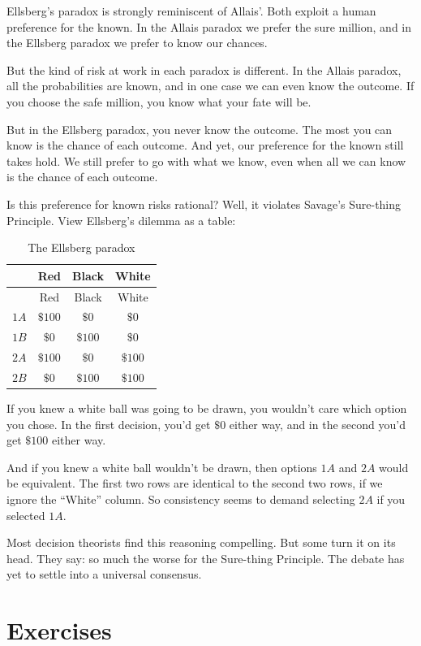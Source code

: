 \documentclass[justified]{tufte-book}
\theoremstyle{definition}
\theoremstyle{definition}
\theoremstyle{definition}
\theoremstyle{definition}
\theoremstyle{remark}
\begin{document}
Ellsberg's paradox is strongly reminiscent of Allais'. Both exploit a human preference for the known. In the Allais paradox we prefer the sure million, and in the Ellsberg paradox we prefer to know our chances.

But the kind of risk at work in each paradox is different. In the Allais paradox, all the probabilities are known, and in one case we can even know the outcome. If you choose the safe million, you know what your fate will be.

But in the Ellsberg paradox, you never know the outcome. The most you can know is the chance of each outcome. And yet, our preference for the known still takes hold. We still prefer to go with what we know, even when all we can know is the chance of each outcome.

Is this preference for known risks rational? Well, it violates Savage's Sure-thing Principle. View Ellsberg's dilemma as a table:

\begin{longtable}[]{@{}lccc@{}}
\caption{\label{tab:unnamed-chunk-115}The Ellsberg paradox}\tabularnewline
\toprule
& Red & Black & White \\
\midrule
\endfirsthead
\toprule
& Red & Black & White \\
\midrule
\endhead
\(1A\) & \(\$100\) & \(\$0\) & \(\$0\) \\
\(1B\) & \(\$0\) & \(\$100\) & \(\$0\) \\
\(2A\) & \(\$100\) & \(\$0\) & \(\$100\) \\
\(2B\) & \(\$0\) & \(\$100\) & \(\$100\) \\
\bottomrule
\end{longtable}

If you knew a white ball was going to be drawn, you wouldn't care which option you chose. In the first decision, you'd get \(\$0\) either way, and in the second you'd get \(\$100\) either way.

And if you knew a white ball wouldn't be drawn, then options \(1A\) and \(2A\) would be equivalent. The first two rows are identical to the second two rows, if we ignore the ``White'' column. So consistency seems to demand selecting \(2A\) if you selected \(1A\).

Most decision theorists find this reasoning compelling. But some turn it on its head. They say: so much the worse for the Sure-thing Principle. The debate has yet to settle into a universal consensus.

\hypertarget{exercises-11}{%
\section*{Exercises}\label{exercises-11}}
\end{document}

